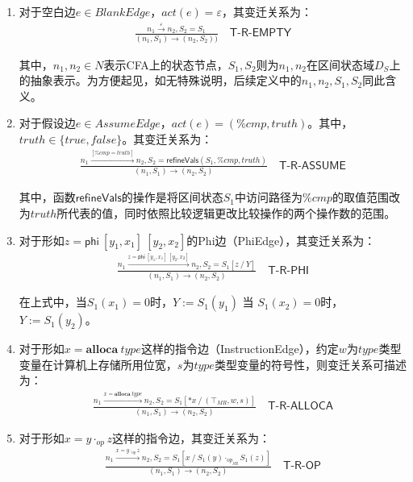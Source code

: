 \begin{enumerate}

\item 对于空白边$ e \in BlankEdge $，$ act(e) = \varepsilon $，其变迁关系为：
\begin{align}
	\frac{n_1 \xrightarrow{\varepsilon} n_2, S_2 = S_1}{(n_1, S_1) \to (n_2, S_2))}
	\quad\textsf{T-R-EMPTY}
\end{align}

其中，$ n_1, n_2 \in N $表示CFA上的状态节点，$ S_1, S_2 $则为$ n_1, n_2 $在区间状态域$ D_S $上的抽象表示。为方便起见，如无特殊说明，后续定义中的$ n_1, n_2, S_1, S_2 $同此含义。

\item 对于假设边$ e \in AssumeEdge $，$ act(e) = (\%cmp, truth) $。其中，$ truth \in \{true, false\} $。其变迁关系为：
\begin{align}
	\frac{n_1 \xrightarrow{[\%cmp = truth]} n_2, 
		S_2 = \mathsf{refineVals}(S_1, \%cmp, truth)}
	{(n_1, S_1) \to (n_2, S_2)}
	\quad\textsf{T-R-ASSUME}
\end{align}

其中，函数$ \mathsf{refineVals} $的操作是将区间状态$ S_1 $中访问路径为$ \%cmp $的取值范围改为$ truth $所代表的值，同时依照比较逻辑更改比较操作的两个操作数的范围。

\item 对于形如$ z = \mathsf{phi}~[y_1, x_1]~[y_2, x_2] $的Phi边（PhiEdge），其变迁关系为：
\begin{align}
\frac{n_1 \xrightarrow{z = \mathsf{phi}~[y_1, x_1]~[y_2, x_2] } n_2, 
	S_2 = S_1[z ~/~ Y ]}
{(n_1, S_1) \to (n_2, S_2)}
\quad\textsf{T-R-PHI}
\end{align}

在上式中，当$ S_1(x_1) = 0 $时，$ Y := 	S_1(y_1) $ 当 $ S_1(x_2) = 0 $时，$ Y :=  S_1(y_2) $。

\item 对于形如$ x = \mathbf{alloca}  ~type $这样的指令边（InstructionEdge），约定$ w $为$ type $类型变量在计算机上存储所用位宽，$ s $为$ type $类型变量的符号性，则变迁关系可描述为：
\begin{align}
	\frac{n_1 \xrightarrow{x = \mathbf{alloca}  ~type} n_2, 
		S_2 = S_1[*x ~/~ (\top_{MR}, w, s) ]}
	{(n_1, S_1) \to (n_2, S_2)}
	\quad\textsf{T-R-ALLOCA}
\end{align}

\item 对于形如$ x = y \cdot_{op} z $这样的指令边，其变迁关系为：
\begin{align}
	\frac{n_1 \xrightarrow{x = y \cdot_{op} z} n_2, 
		S_2 = S_1[x ~/~ S_1(y) \cdot_{op_{SR}} S_1(z) ]}
	{(n_1, S_1) \to (n_2, S_2)}
	\quad\textsf{T-R-OP}
\end{align}


\end{enumerate}
